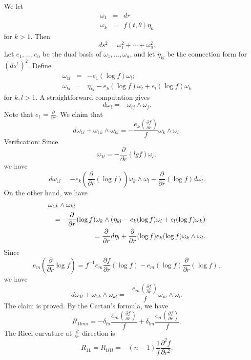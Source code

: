 We let 
\begin{eqnarray*}\omega_1 & = &d r \\
\omega_k & = &f (t , \theta ) \eta_k
\end{eqnarray*}
for $k>1$.
Then 
%
\[ d s^2 = \omega ^2_1 + \cdots +\omega ^2_n .\]
Let $ e_1 , \ldots, e _n $ be the dual basis of $ \omega_1, \ldots, \omega_n $, and let $ \eta_{kl} $ be the connection form for $ (ds^1)^2 $. Define
%
\begin{eqnarray*}
\omega_{1l} & = & - e _1 (\log f) \omega_l;\\
\omega_{kl} & = & \eta _{kl} - e _k (\log f) \omega_l + e _l (\log f) \omega _k\end{eqnarray*}
for $ k , l > 1$. A straightforward computation gives
%
\[ d \omega_i = - \omega_{ij} \wedge \omega_j .\]
%
Note that $ e_1 = \frac{\partial }{\partial r} $. We claim that 
\[ d \omega _{1l} + \omega _{1k} \wedge \omega _{kl} = - \frac{e_k \left( \frac{\partial f}{\partial r} \right)}{f} \omega _k \wedge \omega _l.\]
%
Verification: 
Since
%
\[ \omega _{1l} = - \frac{\partial }{\partial r} (lg f) \omega_l,\]
we have 
\[ d \omega _{1l} = - e _{k}  \left(\frac{\partial }{\partial r}( \log f)  \right) \omega _k \wedge \omega_l - \frac{\partial }{\partial r}( \log f)  d\omega_l . \]
%
On the other hand, we have 
\begin{eqnarray*}
\lefteqn{\omega_{1k} \wedge \omega_{kl} }\\
&& = -\frac{\partial }{\partial r}( \log f)   \omega_k \wedge \left( \eta _{kl} - {e}_k (\log f) \omega_l +    e _l (\log f) \omega _k \right) \\
&  &= \frac{\partial }{\partial r}   d \eta_l +  \frac{\partial }{\partial r}( \log f)     e _k (\log f) \omega_k \wedge \omega_l .
\end{eqnarray*}
%
Since
%
\[ {e} _m \left(\frac{\partial }{\partial r}  \log f\right)    = f^{-1} {e}_m \frac{\partial f}{\partial r}( \log f)    - { e}_m (\log f) \frac{\partial }{\partial r}( \log f),  \]
%
we have 
%
\[ d \omega _{1l} + \omega _{1k} \wedge \omega_{kl} = - \frac{{e}_m \left( \frac{\partial f}{\partial r} \right) }{f} \omega _m \wedge \omega_l.\]
%
The claim is proved. By the Cartan's formula, we have
%
\[R _{1l  m n} = - \delta _{ln}  \frac{{e}_m \left( \frac{\partial f}{\partial r} \right) }{f}  + \delta _{lm} \frac{{e}_n \left( \frac{\partial f}{\partial r} \right) }{f} . \]
%
The Ricci curvature at $ \frac{\partial }{\partial r} $ direction is 
%
\[R_{11} = R_{1 l 1 l} = - (n-1) \frac{1}{f} \frac{\partial ^2 f}{\partial r^2}.\]
%

